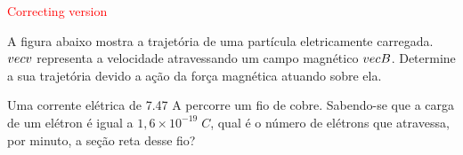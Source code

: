 \documentclass[12pt, addpoints]{exam}
\begin{document}
        \begin{center}
\textcolor{red}{\emph\Large Correcting version}\end{center}
\begin{questions}
\begin{multicols*}{2}
\question[20] A ﬁgura abaixo mostra a trajetória de uma partícula eletricamente carregada. $\\vec{{v}}$ representa a velocidade atravessando um campo magnético $\\vec{{B}}$. Determine a sua trajetória devido a ação da força magnética atuando sobre ela.
        
        \begin{center}
            \begin{minipage}[c]{0.5\linewidth}
            \end{minipage}
        \end{center}

        

\begin{oneparchoices}
\end{oneparchoices}
\question[20] Uma corrente elétrica de    7.47 A percorre um ﬁo de cobre. Sabendo-se que a carga de um elétron é igual a $1,6\times 10^{-19}\;C$, qual é o número de elétrons que atravessa, por minuto, a seção reta desse ﬁo?


\end{multicols*}
\end{questions}
\end{document}
